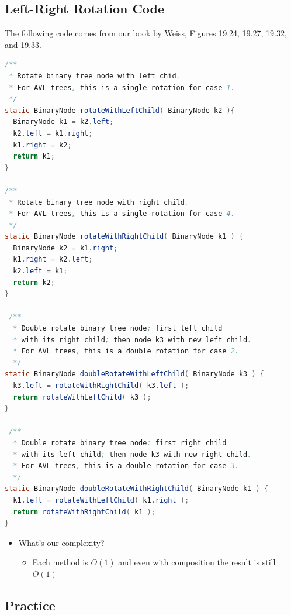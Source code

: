 \documentclass[
  10pt,
  english,
  letterpaper,
,tablecaptionabove
]{scrartcl}
\providecommand{\tightlist}{%
  \setlength{\itemsep}{0pt}\setlength{\parskip}{0pt}}
\begin{document}
\hypertarget{left-right-rotation-code}{%
\subsection{Left-Right Rotation Code}\label{left-right-rotation-code}}

The following code comes from our book by Weiss, Figures 19.24, 19.27,
19.32, and 19.33.

\begin{lstlisting}[language=Java]
/**
 * Rotate binary tree node with left chid.
 * For AVL trees, this is a single rotation for case 1.
 */
static BinaryNode rotateWithLeftChild( BinaryNode k2 ){
  BinaryNode k1 = k2.left;
  k2.left = k1.right;
  k1.right = k2;
  return k1;
}

/**
 * Rotate binary tree node with right child.
 * For AVL trees, this is a single rotation for case 4.
 */
static BinaryNode rotateWithRightChild( BinaryNode k1 ) {
  BinaryNode k2 = k1.right;
  k1.right = k2.left;
  k2.left = k1;
  return k2;
}

 /**
  * Double rotate binary tree node: first left child
  * with its right child; then node k3 with new left child.
  * For AVL trees, this is a double rotation for case 2.
  */
static BinaryNode doubleRotateWithLeftChild( BinaryNode k3 ) {
  k3.left = rotateWithRightChild( k3.left );
  return rotateWithLeftChild( k3 );
}

 /**
  * Double rotate binary tree node: first right child
  * with its left child; then node k3 with new right child.
  * For AVL trees, this is a double rotation for case 3.
  */
static BinaryNode doubleRotateWithRightChild( BinaryNode k1 ) {
  k1.left = rotateWithLeftChild( k1.right );
  return rotateWithRightChild( k1 );
}
\end{lstlisting}

\begin{itemize}
\tightlist
\item
  What's our complexity?

  \begin{itemize}
  \tightlist
  \item
    Each method is \(O(1)\) and even with composition the result is
    still \(O(1)\)
  \end{itemize}
\end{itemize}

\hypertarget{practice}{%
\subsection{Practice}\label{practice}}
\end{document}
